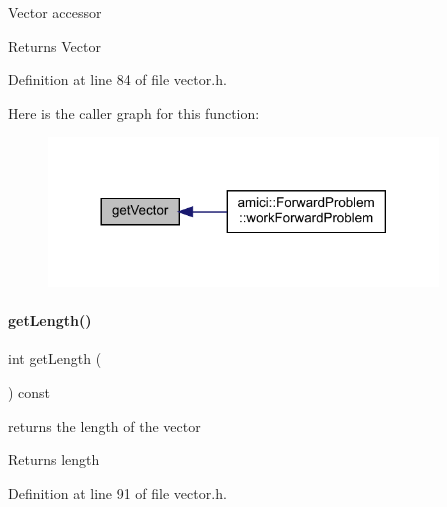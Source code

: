 Vector accessor \begin{DoxyReturn}{Returns}
Vector 
\end{DoxyReturn}


Definition at line 84 of file vector.\+h.

Here is the caller graph for this function\+:
\nopagebreak
\begin{figure}[H]
\begin{center}
\leavevmode
\includegraphics[width=293pt]{classamici_1_1_ami_vector_a5f73cf1c7b6769c44dfb51b048ec4d63_icgraph}
\end{center}
\end{figure}
\mbox{\label{classamici_1_1_ami_vector_a5f00d4dc3e7866d193ce926f35542801}} 
\paragraph{\texorpdfstring{get\+Length()}{getLength()}}
{\footnotesize\ttfamily int get\+Length (\begin{DoxyParamCaption}{ }\end{DoxyParamCaption}) const}

returns the length of the vector \begin{DoxyReturn}{Returns}
length 
\end{DoxyReturn}


Definition at line 91 of file vector.\+h.

